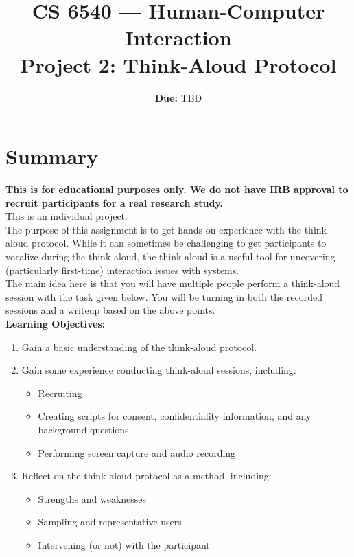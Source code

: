\documentclass{article}
\title{CS 6540 --- Human-Computer Interaction\\\textbf{Project 2: Think-Aloud Protocol}}
\author{ }
\date{\textbf{Due:} TBD}
\begin{document}
\maketitle

\section{Summary}
\textbf{This is for educational purposes only. We do not have IRB approval to recruit participants for a real research study.}\\ 

This is an individual project.\\

The purpose of this assignment is to get hands-on experience with the think-aloud protocol. While it can sometimes be challenging to get participants to vocalize during the think-aloud, the think-aloud is a useful tool for uncovering (particularly first-time) interaction issues with systems.\\

The main idea here is that you will have multiple people perform a think-aloud session with the task given below. You will be turning in both the recorded sessions and a writeup based on the above points.\\
 
\textbf{Learning Objectives:}
\begin{enumerate}
    \item Gain a basic understanding of the think-aloud protocol.
    \item Gain some experience conducting think-aloud sessions, including:
    \begin{itemize}
        \item Recruiting
        \item Creating scripts for consent, confidentiality information, and any background questions
        \item Performing screen capture and audio recording
    \end{itemize}
    \item Reflect on the think-aloud protocol as a method, including:
    \begin{itemize}
        \item Strengths and weaknesses
        \item Sampling and representative users
        \item Intervening (or not) with the participant
    \end{itemize}
\end{enumerate}
\end{document}
